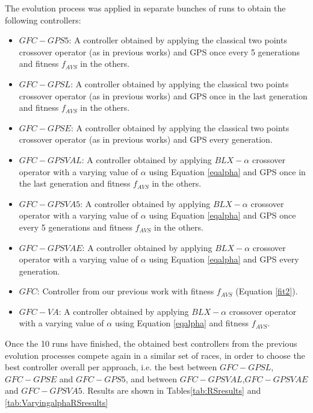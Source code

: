\documentclass[10pt,journal,compsoc]{IEEEtran}
\begin{document}
The evolution process was applied in separate bunches of runs to obtain the following controllers:
\begin{itemize}
	\item $GFC-GPS5$: A controller obtained by applying the classical two points crossover operator (as in previous works) and GPS once every 5 generations and fitness $f_{AVS}$ in the others. 
	\item $GFC-GPSL$: A controller obtained by applying the classical two points crossover operator (as in previous works) and GPS once in the last generation and fitness $f_{AVS}$ in the others. 
	\item $GFC-GPSE$: A controller obtained by applying the classical two points crossover operator (as in previous works) and GPS every generation. 
	 
	\item $GFC-GPSVAL$: A controller obtained by applying $BLX-\alpha$ crossover operator with a varying value of $\alpha$ using Equation \ref{eqalpha} and GPS once in the last generation and fitness $f_{AVS}$ in the others. 
	 
	\item $GFC-GPSVA5$: A controller obtained by applying $BLX-\alpha$ crossover operator with a varying value of $\alpha$ using Equation \ref{eqalpha} and GPS once every 5 generations and fitness $f_{AVS}$ in the others. 
	 
	\item $GFC-GPSVAE$: A controller obtained by applying $BLX-\alpha$ crossover operator with a varying value of $\alpha$ using Equation \ref{eqalpha} and GPS every generation. 
	
		\item $GFC$: Controller  from our previous work \cite{salem_cig2018} with fitness  $f_{AVS}$ (Equation \ref{fit2}).
	\item $GFC-VA$: A controller obtained by applying $BLX-\alpha$ crossover operator with a varying value of $\alpha$ using Equation \ref{eqalpha} and fitness $f_{AVS}$. 	
\end{itemize}

Once the 10 runs have finished, the obtained best controllers from the previous evolution processes compete again in a similar set of races, in order to choose the best controller overall per approach, i.e. the best between $GFC-GPSL$, $GFC-GPSE$ and $GFC-GPS5$, and between $GFC-GPSVAL$,$GFC-GPSVAE$ and $GFC-GPSVA5$.
Results are shown in Tables\ref{tab:RSresults} and \ref{tab:VaryingalphaRSresults}
\end{document}
